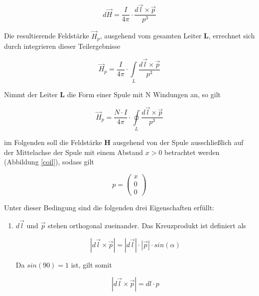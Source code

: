{{\begin{equation}
  d\vec{H} = \frac{I}{4\pi} \cdot \frac{d\vec{l} \times \vec{p}}{p^3}
\end{equation}

\noindent Die resultierende Feldstärke \(\vec{H}_p\), ausgehend vom gesamten Leiter \textbf{L}, errechnet sich durch integrieren dieser Teilergebnisse 

\begin{equation}
  \vec{H}_p = \frac{I}{4\pi} \cdot \int\limits_L \frac{d\vec{l} \times \vec{p}}{p^3}
\end{equation}

\noindent Nimmt der Leiter \textbf{L} die Form einer Spule mit N Windungen an, so gilt

\begin{equation}
  \vec{H}_p = \frac{N \cdot I}{4\pi} \cdot \oint\limits_L \frac{d\vec{l} \times \vec{p}}{p^3}
  \label{eq:savatCoil}
\end{equation}

\noindent im Folgenden soll die Feldstärke \textbf{H} ausgehend von der Spule ausschließlich auf der Mittelachse der Spule mit einem Abstand \(x > 0\) betrachtet werden (Abbildung \ref{coil}), sodass gilt

\begin{equation}
  p = \left(\begin{array}{c} x \\ 0 \\ 0 \end{array}\right)
\end{equation}

\clearpage

\noindent Unter dieser Bedingung sind die folgenden drei Eigenschaften erfüllt: 

\begin{enumerate}
  \item \(d\vec{l}\) und \(\vec{p}\) stehen orthogonal zueinander. Das Kreuzprodukt ist definiert als
  
  \begin{equation}
    |d\vec{l} \times \vec{p}| = |d\vec{l}| \cdot |\vec{p}| \cdot sin(\alpha)
  \end{equation}
  
  Da \(sin(90) = 1\) ist, gilt somit
  
  \begin{equation}
    |d\vec{l} \times \vec{p}| = dl \cdot p
  \end{equation} 
  

\end{enumerate}}}
